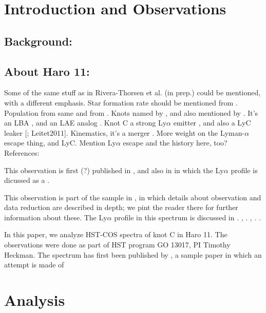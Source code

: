 \documentclass[preprint2]{aastex6}
\begin{document}
\section{Introduction and
Observations}\label{introduction-and-observations}

\subsection{Background:}\label{background}

\subsection{About Haro 11:}\label{about-haro-11}

Some of the same stuff as in Rivera-Thorsen et al. (in prep.) could be
mentioned, with a different emphasis. Star formation rate should be
mentioned from \citet{Adamo2010}. Population from same and from
\citet{Micheva2010}. Knots named by \citet{Vader1993}, and also
mentioned by \citet{Kunth2003}. It's an LBA \citep{Hoopes2007}, and an
LAE analog \citep{Hayes2007, Leitet2011}. Knot C a strong Ly$\alpha$
emitter \citep{Hayes2007}, and also a LyC leaker
{[}\citet{Bergvall2006}; Leitet2011{]}. Kinematics, it's a merger
\citep{Ostlin1999, Ostlin2001, Ostlin2015}. More weight on the
Lyman-$\alpha$ escape thing, and LyC. Mention Ly$\alpha$ escape and the
history here, too? References:

This observation is first (?) published in \citet{Alexandroff2015}, and
also in \citet{Verhamme2015} in which the Ly$\alpha$ profile is dicussed
as a .

This observation is part of the sample in \citet{Alexandroff2015}, in
which details about observation and data reduction are described in
depth; we pint the reader there for further information about these. The
Ly$\alpha$ profile in this spectrum is discussed in
\citet{Verhamme2015}. \citet{Heckman2011}, \citet{Heckman2015}.
\citet{Jaskot2013}, \citet{JaskotOey}. \citet{Bouwens2012}.

In this paper, we analyze HST-COS spectra of knot C in Haro 11. The
observations were done as part of HST program GO 13017, PI Timothy
Heckman. The spectrum has first been published by
\citet{Alexandroff2015}, a sample paper in which an attempt is made of

\section{Analysis}\label{analysis}
\end{document}
